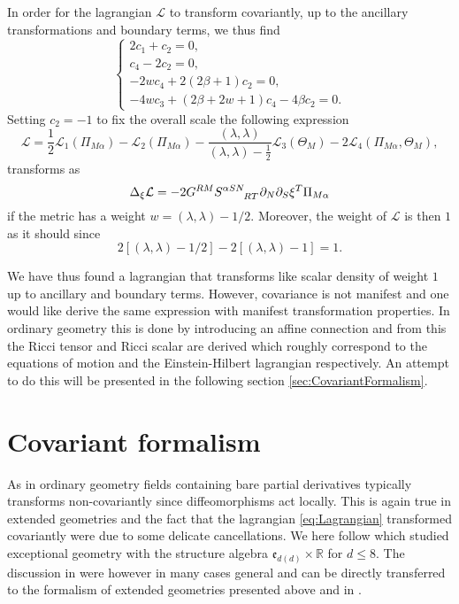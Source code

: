 In order for the lagrangian $\mathcal{L}$ to transform covariantly, up to the ancillary transformations and boundary terms, we thus find 
\begin{equation}
    \begin{cases}
        2c_1+c_2 = 0,\\
        c_4-2c_2 = 0,\\
        -2wc_4+2(2\beta+1)c_2 = 0,\\
        -4wc_3+(2\beta+2w+1)c_4-4\beta c_2 = 0.
    \end{cases}
\end{equation}
Setting $c_2=-1$ to fix the overall scale the following expression
\begin{equation}\label{eq:Lagrangian}
    \mathcal{L} = \frac{1}{2}\mathcal{L}_1(\Pi_{M\alpha})-\mathcal{L}_2(\Pi_{M\alpha})-\frac{(\lambda,\lambda)}{(\lambda,\lambda)-\frac{1}{2}}\mathcal{L}_3(\Theta_M)-2\mathcal{L}_4(\Pi_{M\alpha},\Theta_M),
\end{equation}
transforms as 
\begin{equation}
    \Delta_\xi \mathcal{L} = -2G^{RM}\tensor{S}{^{\alpha SN}_{RT}}\pd_N\pd_S\xi^T\Pi_{M\alpha}
\end{equation}
if the metric has a weight $w=(\lambda,\lambda)-1/2$. Moreover, the weight of $\mathcal{L}$ is then $1$ as it should since 
\begin{equation}
    2[(\lambda,\lambda)-1/2]-2[(\lambda,\lambda)-1] = 1. 
\end{equation}

We have thus found a lagrangian that transforms like scalar density of weight $1$ up to ancillary and boundary terms. However, covariance is not manifest and one would like derive the same expression with manifest transformation properties. In ordinary geometry this is done by introducing an affine connection and from this the Ricci tensor and Ricci scalar are derived which roughly correspond to the equations of motion and the Einstein-Hilbert lagrangian respectively. An attempt to do this will be presented in the following section \ref{sec:CovariantFormalism}. 

\section{Covariant formalism\label{sec:CovariantFormalism}}
As in ordinary geometry fields containing bare partial derivatives typically transforms non-covariantly since diffeomorphisms act locally. This is again true in extended geometries and the fact that the lagrangian \eqref{eq:Lagrangian} transformed covariantly were due to some delicate cancellations. We here follow \cite{Cederwall:2013naa} which studied exceptional geometry with the structure algebra $\mathfrak{e}_{d(d)}\times\mathbb{R}$ for $d\leq 8$. The discussion in \cite{Cederwall:2013naa} were however in many cases general and can be directly transferred to the formalism of extended geometries presented above and in \cite{CederwallPalmkvist2017}.

